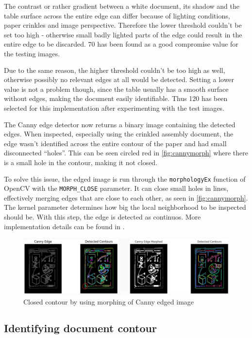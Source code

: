 The contrast or rather gradient between a white document, its shadow and the table surface across the entire edge can differ because of lighting conditions, paper crinkles and image perspective. Therefore the lower threshold couldn't be set too high - otherwise small badly lighted parts of the edge could result in the entire edge to be discarded. 70 has been found as a good compromise value for the testing images.

Due to the same reason, the higher threshold couldn't be too high as well, otherwise possibly no relevant edges at all would be detected. Setting a lower value is not a problem though, since the table usually has a smooth surface without edges, making the document easily identifiable. Thus 120 has been selected for this implementation after experimenting with the test images.

The Canny edge detector now returns a binary image containing the detected edges. When inspected, especially using the crinkled assembly document, the edge wasn't identified across the entire contour of the paper and had small disconnected \enquote{holes}. This can be seen circled red in \autoref{fig:cannymorph} where there is a small hole in the contour, making it not closed.

To solve this issue, the edged image is run through the \texttt{morphologyEx} function of OpenCV with the \texttt{MORPH\_CLOSE} parameter. It can close small holes in lines, effectively merging edges that are close to each other, as seen in \autoref{fig:cannymorph}. The kernel parameter determines how big the local neighborhood to be inspected should be. With this step, the edge is detected as continuos. More implementation details can be found in \cite{cv_morph}.

\begin{figure}[h]
    \includegraphics[width=1\textwidth]{figures/canny.jpg}
    \centering
    \caption{Closed contour by using morphing of Canny edged image}
    \label{fig:cannymorph}
\end{figure}

\subsection{Identifying document contour}

